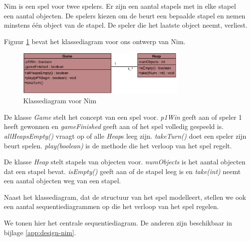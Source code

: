 Nim is een spel voor twee spelers. Er zijn een aantal stapels met in elke stapel een aantal objecten. De spelers kiezen om de beurt een bepaalde stapel en nemen minstens \'e\'en object van de stapel. De speler die het laatste object neemt, verliest.

Figuur \ref{fig:nim-cd} bevat het klassediagram voor ons ontwerp van Nim.

\begin{figure}[htp]
	\centering
	\includegraphics[width=0.75\textwidth]{chap-evaluatie/ClassDiagram1.png}
	\caption{Klassediagram voor Nim}
	\label{fig:nim-cd}
\end{figure}

De klasse \textit{Game} stelt het concept van een spel voor. \textit{p1Win} geeft aan of speler 1 heeft gewonnen en \textit{gameFinished} geeft aan of het spel volledig gespeeld is. \textit{allHeapsEmpty()} vraagt op of alle \textit{Heap}s leeg zijn. \textit{takeTurn()} doet een speler zijn beurt spelen. \textit{play(boolean)} is de methode die het verloop van het spel regelt.

De klasse \textit{Heap} stelt stapels van objecten voor. \textit{numObjects} is het aantal objecten dat een stapel bevat. \textit{isEmpty()} geeft aan of de stapel leeg is en \textit{take(int)} neemt een aantal objecten weg van een stapel.

Naast het klassediagram, dat de structuur van het spel modelleert, stellen we ook een aantal sequentiediagrammen op die het verloop van het spel regelen.

We tonen hier het centrale sequentiediagram. De anderen zijn beschikbaar in bijlage \ref{app:design-nim}.

